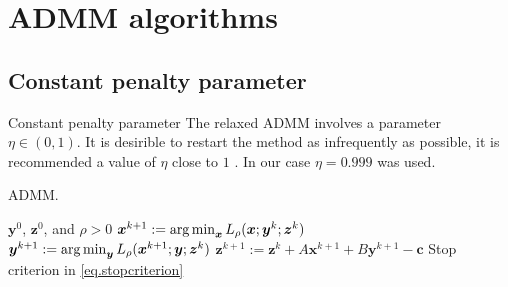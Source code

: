 \documentclass[8pt,red]{beamer}
\theoremstyle{plain}
\theoremstyle{definition}
\theoremstyle{remark}
\newcommand{\argmin}{\operatornamewithlimits{\mathrm{arg\,min}}}
\newcommand{\bi}[1]{\ensuremath{\boldsymbol{#1}}}
\begin{document}
\section{ADMM algorithms}

\subsection{Constant penalty parameter}
\begin{frame}{Constant penalty parameter}
The relaxed ADMM involves a parameter $\eta \in (0,1)$. It is desirible to restart the method as infrequently as possible, it is recommended a value of $\eta$ close to $1$ \citep{goldstein2014fast}. In our case $\eta = 0.999$ was used.

\begin{algorithm}[H]
  \scriptsize
  \caption{ADMM.}
  \label{alg:prototype.cp-N}
  \begin{algorithmic}[1]
    \Require
    $\bi{y}^{0}$, $\bi{z}^{0}$, and $\rho > 0$ 
    \State
    $\bi{x}^{k+1} 
    := \argmin_{\bi{x}} L_{\rho}(\bi{x};\bi{y}^{k};{\bi{z}}^{k})$ 
    \State
    $\bi{y}^{k+1} 
    := \argmin_{\bi{y}} L_{\rho}(\bi{x}^{k+1};\bi{y};{\bi{z}}^{k})$ 
    \State
    $\bi{z}^{k+1} 
  := \bi{z}^{k} + A \bi{x}^{k+1} + B \bi{y}^{k+1} - \bi{c}$ 
    \State
    Stop criterion in \eqref{eq.stopcriterion}
    \EndFor
  \end{algorithmic}
\end{algorithm}
\end{frame}
\end{document}
